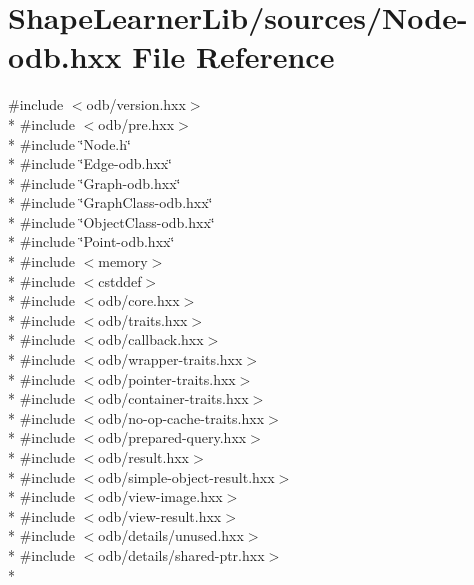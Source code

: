 \hypertarget{_node-odb_8hxx}{}\section{Shape\+Learner\+Lib/sources/\+Node-\/odb.hxx File Reference}
\label{_node-odb_8hxx}
{\ttfamily \#include $<$odb/version.\+hxx$>$}\\*
{\ttfamily \#include $<$odb/pre.\+hxx$>$}\\*
{\ttfamily \#include \char`\"{}Node.\+h\char`\"{}}\\*
{\ttfamily \#include \char`\"{}Edge-\/odb.\+hxx\char`\"{}}\\*
{\ttfamily \#include \char`\"{}Graph-\/odb.\+hxx\char`\"{}}\\*
{\ttfamily \#include \char`\"{}Graph\+Class-\/odb.\+hxx\char`\"{}}\\*
{\ttfamily \#include \char`\"{}Object\+Class-\/odb.\+hxx\char`\"{}}\\*
{\ttfamily \#include \char`\"{}Point-\/odb.\+hxx\char`\"{}}\\*
{\ttfamily \#include $<$memory$>$}\\*
{\ttfamily \#include $<$cstddef$>$}\\*
{\ttfamily \#include $<$odb/core.\+hxx$>$}\\*
{\ttfamily \#include $<$odb/traits.\+hxx$>$}\\*
{\ttfamily \#include $<$odb/callback.\+hxx$>$}\\*
{\ttfamily \#include $<$odb/wrapper-\/traits.\+hxx$>$}\\*
{\ttfamily \#include $<$odb/pointer-\/traits.\+hxx$>$}\\*
{\ttfamily \#include $<$odb/container-\/traits.\+hxx$>$}\\*
{\ttfamily \#include $<$odb/no-\/op-\/cache-\/traits.\+hxx$>$}\\*
{\ttfamily \#include $<$odb/prepared-\/query.\+hxx$>$}\\*
{\ttfamily \#include $<$odb/result.\+hxx$>$}\\*
{\ttfamily \#include $<$odb/simple-\/object-\/result.\+hxx$>$}\\*
{\ttfamily \#include $<$odb/view-\/image.\+hxx$>$}\\*
{\ttfamily \#include $<$odb/view-\/result.\+hxx$>$}\\*
{\ttfamily \#include $<$odb/details/unused.\+hxx$>$}\\*
{\ttfamily \#include $<$odb/details/shared-\/ptr.\+hxx$>$}\\*
